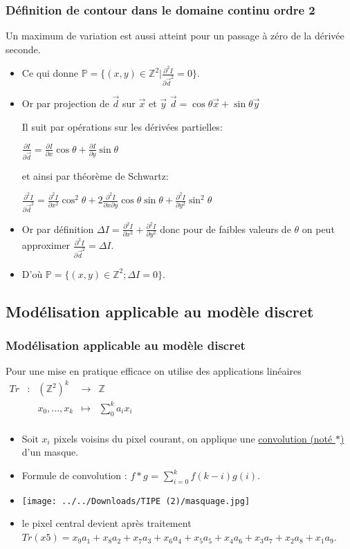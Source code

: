 \documentclass{beamer}
\newcommand{\divp}[2]
	{
	  \frac{\partial #1}{\partial #2}
	}
\newcommand{\divpsnd}[2]
	{
	  \frac{\partial^2 #1}{\partial #2^2}
	}
\newcommand{\Z}{\mathbb{Z}}
\newcommand{\fct}[5]
	{
	  \begin{array}{ccccc}
		#1 & : & #2 & \to & #3 \\
	    && #4 & \mapsto & #5 \\
	  \end{array}
	}
\begin{document}
\begin{frame}
\frametitle{Définition de contour dans le domaine continu ordre 2}
Un maximum de variation est aussi atteint pour un passage à zéro de la dérivée seconde.
\begin{itemize}

\item <1-> Ce qui donne $\mathbb{P} = \lbrace(x,y) \in \Z^2 | \divpsnd{I}{\vec{d}} = 0 \rbrace  $.
\item <2> Or par projection de $\vec{d}$ sur $\vec{x} $ et $\vec{y}$
$\vec{d} = \cos\theta \vec{x} + \sin\theta \vec{y}$

\vspace{0.15cm}
Il suit par opérations sur les dérivées partielles:

$\divp{I}{\vec{d}} = \divp{I}{x} \cos\theta + \divp{I}{y}\sin \theta$

et ainsi par théorème de Schwartz:

$\divpsnd{I}{\vec{d}} = \divpsnd{I}{x} \cos^2 \theta + 2 \frac{\partial^2 I}{\partial x \partial y} \cos\theta \sin \theta + \divpsnd{I}{y} \sin^2\theta$
\item <3> Or par définition $\Delta I = \divpsnd{I}{x} +\divpsnd{I}{y}$ donc pour de faibles valeurs de $\theta$ on peut approximer $\divpsnd{I}{\vec{d}} = \Delta I$.
\item <3-> D'où $\mathbb{P} = \lbrace(x,y) \in \Z^2 ; \Delta I = 0 \rbrace$.

\end{itemize}
\end{frame}

\subsection{Modélisation applicable au modèle discret}
\begin{frame}
\frametitle{Modélisation applicable au modèle discret}
Pour une mise en pratique efficace on utilise des applications linéaires $\fct{Tr}{(\Z^2)^k}{\Z}{x_0,...,x_k}{\sum_0^k a_i x_i} $

\begin{itemize}
\item  Soit $x_i$ pixels voisins du pixel courant, on applique une \underline{convolution (noté $*$)} d'un masque.

\item Formule de convolution : $f * g$ = $\sum_{i=0}^k f(k-i)g(i)$.

\item \texttt{[image: ../../Downloads/TIPE (2)/masquage.jpg]}

\item le pixel central devient après traitement $Tr(x5) = x_9 a_1 + x_8 a_2 + x_7 a_3 + x_6 a_4 + x_5 a_5 + x_4 a_6 +x_3 a_7 +x_2 a_8 +x_1 a_9$.
\end{itemize}
\end{frame}
\end{document}
